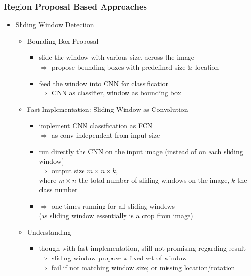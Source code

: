 \subsubsection{Region Proposal Based Approaches}
\begin{itemize}
\item Sliding Window Detection
	\begin{itemize}
	\item Bounding Box Proposal
		\begin{itemize}
		\item slide the window with various size, across the image \\
		$\Rightarrow$ propose bounding boxes with predefined size \& location
		\item feed the window into CNN for classification \\
		$\Rightarrow$ CNN as classifier, window as bounding box
		\end{itemize}
	\item Fast Implementation: Sliding Window as Convolution
		\begin{itemize}
		\item implement CNN classification as \hyperref[DL_Arch_FCN]{FCN} \\
		$\Rightarrow$ as conv independent from input size
		\item run directly the CNN on the input image (instead of on each sliding window) \\
		$\Rightarrow$ output size $m\times n \times k$, \\ 
		where $m\times n$ the total number of sliding windows on the image, $k$ the class number
		\item $\Rightarrow$ one times running for all sliding windows \\ 
		(as sliding window essentially is a crop from image)
		\end{itemize}
	\item Understanding
		\begin{itemize}
		\item though with fast implementation, still not promising regarding result \\
		$\Rightarrow$ sliding window propose a fixed set of window \\
		$\Rightarrow$ fail if not matching window size; or missing location/rotation
		\end{itemize}
	\end{itemize}


\end{itemize}

